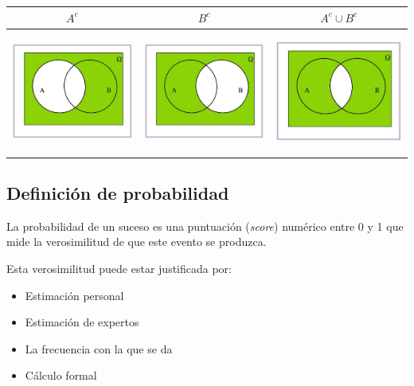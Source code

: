 \documentclass[]{book}
\providecommand{\tightlist}{%
  \setlength{\itemsep}{0pt}\setlength{\parskip}{0pt}}
\begin{document}
\begin{longtable}[]{@{}ccc@{}}
\toprule
\(A^c\) & \(B^c\) & \(A^c\cup B^c\)\tabularnewline
\midrule
\endhead
\includegraphics[width=\textwidth,height=4cm]{Images/proba1dibujos/demorgan3.jpg} & \includegraphics[width=\textwidth,height=4cm]{Images/proba1dibujos/demorgan5.jpg} & \includegraphics[width=\textwidth,height=4cm]{Images/proba1dibujos/demorgan4.jpg}\tabularnewline
\bottomrule
\end{longtable}

\hypertarget{definiciuxf3n-de-probabilidad}{%
\subsection{Definición de probabilidad}\label{definiciuxf3n-de-probabilidad}}

La probabilidad de un suceso es una puntuación (\emph{score}) numérico entre 0 y 1 que mide la verosimilitud de que este evento se produzca.

Esta verosimilitud puede estar justificada por:

\begin{itemize}
\tightlist
\item
  Estimación personal
\item
  Estimación de expertos
\item
  La frecuencia con la que se da
\item
  Cálculo formal
\end{itemize}
\end{document}
